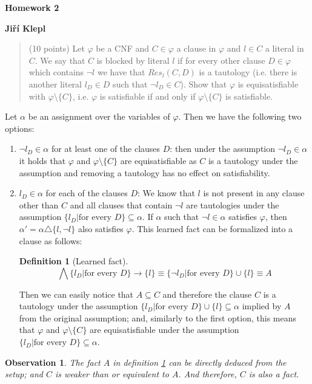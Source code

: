 \documentclass[a4paper,12pt]{article} %
\newtheorem{definition}{Definition}
\newtheorem{observation}{Observation}[definition]
\begin{document}
\begin{center}
    {\Large \bf Homework 2}
    \vspace{2mm}

    {\bf Jiří Klepl}

\end{center}

\vspace{0.4cm}

\begin{quote}
    (10 points) Let $\varphi$ be a CNF and $C \in \varphi$ a clause in $\varphi$ and $l \in C$ a literal in $C$. We say that $C$ is
blocked by literal $l$ if for every other clause $D \in \varphi$ which contains $\neg l$ we have that $Res_l(C, D)$ is a
tautology (i.e. there is another literal $l_D \in D$ such that $\neg l_D \in C$). Show that $\varphi$ is equisatisfiable with
$\varphi \setminus \{C\}$, i.e. $\varphi$ is satisfiable if and only if $\varphi \setminus \{C\}$ is satisfiable.
\end{quote}

Let $\alpha$ be an assignment over the variables of $\varphi$. Then we have the following two options:

\begin{enumerate}
    \item $\neg l_D \in \alpha$ for at least one of the clauses $D$: then under the assumption $\neg l_D \in \alpha$ it holds that $\varphi$ and $\varphi \setminus \{C\}$ are equisatisfiable as $C$ is a tautology under the assumption and removing a tautology has no effect on satisfiability.
    \item $l_D \in \alpha$ for each of the clauses $D$: We know that $l$ is not present in any clause other than $C$ and all clauses that contain $\neg l$ are tautologies under the assumption $\{l_D | \text{for every } D\} \subseteq \alpha$. If $\alpha$ such that $\neg l \in \alpha$ satisfies $\varphi$, then $\alpha' = \alpha \triangle \{l, \neg l\}$ also satisfies $\varphi$. This learned fact can be formalized into a clause as follows:
    \begin{definition}[Learned fact]
        \label{learned_fact}
        $$\bigwedge \{l_D | \text{for every } D\} \to \{l\} \equiv \{\neg l_D | \text{for every } D\} \cup \{l\} \equiv A$$
    \end{definition}
    Then we can easily notice that $A \subseteq C$ and therefore the clause $C$ is a tautology under the assumption $\{l_D | \text{for every } D\} \cup \{l\} \subseteq \alpha$ implied by $A$ from the original assumption; and, similarly to the first option, this means that $\varphi$ and $\varphi \setminus \{C\}$ are equisatisfiable under the assumption $\{l_D | \text{for every } D\} \subseteq \alpha$.
\end{enumerate}

\begin{observation}
    The fact $A$ in definition \ref{learned_fact} can be directly deduced from the setup; and $C$ is weaker than or equivalent to $A$. And therefore, $C$ is also a fact.
\end{observation}
\end{document}
